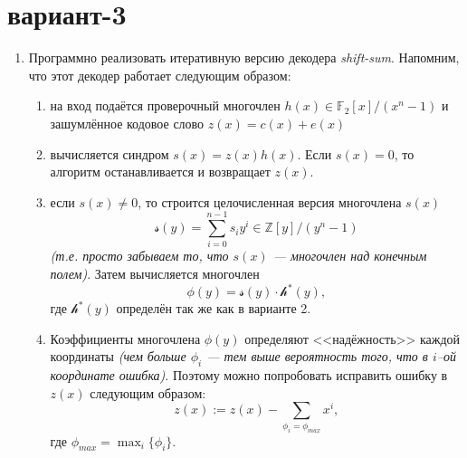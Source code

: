 \documentclass[12pt,letterpaper]{article}
\newcommand{\ZZ}{\mathds{Z}}
\newcommand{\FF}{\mathds{F}}
\begin{document}
\section*{вариант-3}
\begin{enumerate}[\bfseries 1.]
  \item Программно реализовать итеративную версию декодера \emph{shift-sum}. Напомним, что этот декодер работает следующим образом:
  \begin{enumerate}[\it i)]
    \item на вход подаётся проверочный многочлен $h(x) \in \FF_2[x]/(x^n-1)$ и зашумлённое кодовое слово $z(x) = c(x) + e(x)$
    \item вычисляется синдром $s(x) = z(x) h(x)$. Если $s(x) = 0$, то алгоритм останавливается и возвращает $z(x)$.
    \item если $s(x) \neq 0$, то строится целочисленная версия многочлена $s(x)$ 
    \[ \mathcal{s}(y) = \sum_{i=0}^{n-1} s_i y^i \in \ZZ[y]/(y^n-1) \]
    \emph{(т.е. просто забываем то, что $s(x)$ --- многочлен над конечным полем)}. Затем вычисляется многочлен
    \[ \phi(y) = \mathcal{s}(y) \cdot \mathcal{h}^*(y), \]
    где $\mathcal{h^*}(y)$ определён так же как в варианте 2. 
    \item Коэффициенты многочлена $\phi(y)$ определяют <<надёжность>> каждой координаты \emph{(чем больше $\phi_i$ --- тем выше вероятность того, что в $i$--ой координате ошибка)}. 
    Поэтому можно попробовать исправить ошибку в $z(x)$ следующим образом:
    \[ z(x) := z(x) - \sum_{\phi_i = \phi_{max}} x^i, \]
    где $\phi_{max} = \max_i \{ \phi_i \}$. 
    

\end{enumerate}
\end{enumerate}
\end{document}
